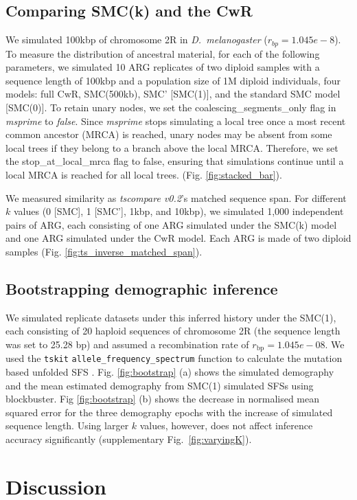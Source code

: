 \documentclass[9pt,twocolumn,twoside,lineno]{gsajnl}
\begin{document}
\subsection{Comparing SMC(k) and the CwR}
We simulated 100kbp of chromosome 2R in \textit{D.\ melanogaster} ($r_{bp}=1.045e-8$). To measure the distribution of ancestral material, for each of the following parameters, we simulated 10 ARG replicates of two diploid samples with a sequence length of 100kbp and a population size of 1M  diploid individuals, four models: full CwR, SMC(500kb), SMC' [SMC(1)], and the standard SMC model [SMC(0)]. To retain unary nodes, we set the coalescing\_segments\_only flag in \textit{msprime} to \textit{false}. Since \textit{msprime} stops simulating a local tree once a most recent common ancestor (MRCA) is reached, unary nodes may be absent from some local trees if they belong to a branch above the local MRCA. Therefore, we set the stop\_at\_local\_mrca flag to false, ensuring that simulations continue until a local MRCA is reached for all local trees. (Fig.  \ref{fig:stacked_bar}).

We measured similarity as \textit{tscompare v0.2}'s matched sequence span. For different $k$ values (0 [SMC], 1 [SMC'], 1kbp, and 10kbp), we simulated 1,000 independent pairs of ARG, each consisting of one ARG simulated under the SMC(k) model and one ARG simulated under the CwR model. Each ARG is made of two diploid samples (Fig. \ref{fig:ts_inverse_matched_span}).

\subsection{Bootstrapping demographic inference}
We simulated replicate datasets under this inferred history under the SMC(1), each consisting of 20 haploid sequences of chromosome 2R (the sequence length was set to 25.28 bp) and assumed a recombination rate of $r_\mathrm{bp} = 1.045e-08$. We used the \texttt{tskit} \texttt{allele\_frequency\_spectrum} function to calculate the mutation based unfolded SFS \citep{Ralph2020Stats}. 
Fig. \ref{fig:bootstrap} (a) shows the simulated demography and the mean estimated demography from SMC(1) simulated SFSs using blockbuster. Fig \ref{fig:bootstrap} (b) shows the decrease in normalised mean squared error for the three demography epochs with the increase of simulated sequence length. Using larger $k$ values, however, does not affect inference accuracy significantly (supplementary Fig.~\ref{fig:varyingK}). 

\section{Discussion}
\end{document}
